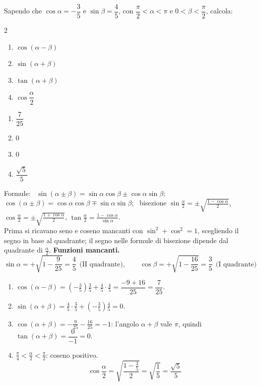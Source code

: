 
\begin{question}[ID=1.4, subtitle={Formule di addizione con $\cos\alpha=-3/5$ e $\sin\beta=4/5$}, tags={goniometria, formule di addizione}, difficulty=media]
Sapendo che $\cos \alpha = -\dfrac{3}{5}$ e $\sin \beta = \dfrac{4}{5}$, con $\dfrac{\pi}{2} < \alpha < \pi$ e $0 < \beta < \dfrac{\pi}{2}$, calcola:
\begin{multicols}{2}
\begin{enumerate}
\item $\cos(\alpha - \beta)$
\item $\sin(\alpha + \beta)$
\item $\tan(\alpha + \beta)$
\item $\cos\dfrac{\alpha}{2}$
\end{enumerate}
\end{multicols}
\begin{solution}
\begin{enumerate}
    \item $\dfrac{7}{25}$
    \item $0$
    \item $0$
    \item $\dfrac{\sqrt5}{5}$
\end{enumerate}
\end{solution}
\begin{explanation}
Formule: \ $\sin(\alpha\pm\beta)=\sin\alpha\cos\beta\pm\cos\alpha\sin\beta$; \ $\cos(\alpha\pm\beta)=\cos\alpha\cos\beta\mp\sin\alpha\sin\beta$; \ bisezione $\sin\tfrac\alpha2=\pm\sqrt{\tfrac{1-\cos\alpha}{2}}$, $\cos\tfrac\alpha2=\pm\sqrt{\tfrac{1+\cos\alpha}{2}}$, $\tan\tfrac\alpha2=\tfrac{1-\cos\alpha}{\sin\alpha}$. \\
Prima si ricavano seno e coseno mancanti con $\sin^2+\cos^2=1$, scegliendo il segno in base al quadrante; il segno nelle formule di bisezione dipende dal quadrante di $\tfrac\alpha2$.
\textbf{Funzioni mancanti.}
\[ \sin\alpha=+\sqrt{1-\dfrac9{25}}=\dfrac45 \ \ \text{(II quadrante)}, \qquad \cos\beta=+\sqrt{1-\dfrac{16}{25}}=\dfrac35 \ \ \text{(I quadrante)} \]
\begin{enumerate}
    \item $\cos(\alpha-\beta)=\left(-\tfrac35\right)\tfrac35+\tfrac45\cdot\tfrac45=\dfrac{-9+16}{25}=\dfrac{7}{25}$.
    \item $\sin(\alpha+\beta)=\tfrac45\cdot\tfrac35+\left(-\tfrac35\right)\tfrac45=0$.
    \item $\cos(\alpha+\beta)=-\tfrac9{25}-\tfrac{16}{25}=-1$: l'angolo $\alpha+\beta$ vale $\pi$, quindi $\tan(\alpha+\beta)=\dfrac{0}{-1}=0$.
    \item $\tfrac\pi4<\tfrac\alpha2<\tfrac\pi2$: coseno positivo.
    \[ \cos\dfrac\alpha2=\sqrt{\dfrac{1-\frac35}{2}}=\sqrt{\dfrac15}=\dfrac{\sqrt5}{5} \]
\end{enumerate}
\end{explanation}
\end{question}

